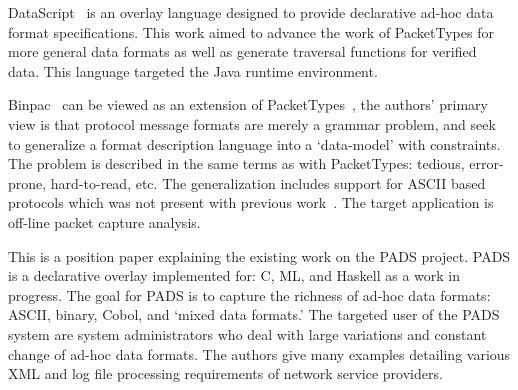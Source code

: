 DataScript~\cite{datascript} is an overlay language designed to provide
declarative ad-hoc data format specifications. This work aimed to advance the
work of PacketTypes for more general data formats as well as generate
traversal functions for verified data. This language targeted the Java
runtime environment.

Binpac~\cite{binpac} can be viewed as an extension of
PacketTypes~\cite{packet_types}, the authors' primary view is that
protocol message formats are merely a grammar problem, and seek
to generalize a format description language into a `data-model' with
constraints. The problem is described in the same terms as with PacketTypes:
tedious, error-prone, hard-to-read, etc. The generalization includes support for
ASCII based protocols which was not present with previous
work~\cite{packet_types}. The target application is off-line packet capture
analysis.

This is a position paper explaining the existing work on
the PADS project. PADS is a declarative overlay implemented for: C, ML, and
Haskell as a work in progress. The goal for PADS is to capture the richness
of ad-hoc data formats: ASCII, binary, Cobol, and `mixed data formats.' The
targeted user of the PADS system are system administrators who deal with large
variations and constant change of ad-hoc data formats. The authors give many
examples detailing various XML and log file processing requirements of network
service providers.


